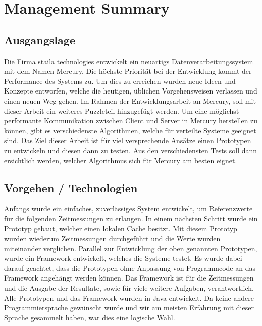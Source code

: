 \chapter*{Management Summary}

\section*{Ausgangslage}
Die Firma staila technologies entwickelt ein neuartigs Datenverarbeitungssystem mit dem Namen Mercury. Die höchste Priorität bei der Entwicklung kommt der Performance des Systems zu. Um dies zu erreichen wurden neue Ideen und Konzepte entworfen, welche die heutigen, üblichen Vorgehensweisen verlassen und einen neuen Weg gehen. \newline
Im Rahmen der Entwicklungsarbeit an Mercury, soll mit dieser Arbeit ein weiteres Puzzleteil hinzugefügt werden. Um eine möglichst performante Kommunikation zwischen Client und Server in Mercury herstellen zu können, gibt es verschiedenste Algorithmen, welche für verteilte Systeme geeignet sind. Das Ziel dieser Arbeit ist für viel versprechende Ansätze einen Prototypen zu entwickeln und diesen dann zu testen. Aus den verschiedensten Tests soll dann ersichtlich werden, welcher Algorithmus sich für Mercury am besten eignet.\newline
\section*{Vorgehen / Technologien}
Anfangs wurde ein einfaches, zuverlässiges System entwickelt, um Referenzwerte für die folgenden Zeitmessungen zu erlangen. In einem nächsten Schritt wurde ein Prototyp gebaut, welcher einen lokalen Cache besitzt. Mit diesem Prototyp wurden wiederum Zeitmessungen durchgeführt und die Werte wurden miteinander verglichen.\newline
Parallel zur Entwicklung der oben genannten Prototypen, wurde ein Framework entwickelt, welches die Systeme testet. Es wurde dabei darauf geachtet, dass die Prototypen ohne Anpassung von Programmcode an das Framework angehängt werden können. Das Framework ist für die Zeitmessungen und die Ausgabe der Resultate, sowie für viele weitere Aufgaben, verantwortlich.\newline
Alle Prototypen und das Framework wurden in Java entwickelt. Da keine andere Programmiersprache gewünscht wurde und wir am meisten Erfahrung mit dieser Sprache gesammelt haben, war dies eine logische Wahl. \newline
